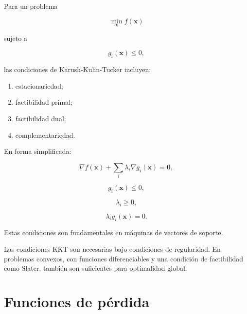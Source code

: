 \documentclass[
  spanish,
  10.5pt,
  letterpaper,
  DIV=11,
  numbers=noendperiod,
  oneside,
  open=any]{scrreprt}
\providecommand{\tightlist}{%
  \setlength{\itemsep}{0pt}\setlength{\parskip}{0pt}}
\theoremstyle{definition}
\theoremstyle{definition}
\theoremstyle{plain}
\theoremstyle{remark}
\begin{document}

Para un problema

\[
\min_{\mathbf{x}}
f(\mathbf{x})
\]

sujeto a

\[
g_i(\mathbf{x})\leq 0,
\]

las condiciones de Karush-Kuhn-Tucker incluyen:

\begin{enumerate}
\def\labelenumi{\arabic{enumi}.}
\tightlist
\item
  estacionariedad;
\item
  factibilidad primal;
\item
  factibilidad dual;
\item
  complementariedad.
\end{enumerate}

En forma simplificada:

\[
\nabla f(\mathbf{x})
+
\sum_i
\lambda_i
\nabla g_i(\mathbf{x})
=
\mathbf{0},
\]

\[
g_i(\mathbf{x})\leq 0,
\]

\[
\lambda_i\geq 0,
\]

\[
\lambda_i g_i(\mathbf{x})=0.
\]

Estas condiciones son fundamentales en máquinas de vectores de soporte.

\begin{tcolorbox}[enhanced jigsaw, arc=.35mm, bottomrule=.15mm, bottomtitle=1mm, breakable, colback=white, colbacktitle=quarto-callout-important-color!10!white, colframe=quarto-callout-important-color-frame, coltitle=black, left=2mm, leftrule=.75mm, opacityback=0, opacitybacktitle=0.6, rightrule=.15mm, title=\textcolor{quarto-callout-important-color}{\faExclamation}\hspace{0.5em}{Condiciones KKT}, titlerule=0mm, toprule=.15mm, toptitle=1mm]

Las condiciones KKT son necesarias bajo condiciones de regularidad. En
problemas convexos, con funciones diferenciables y una condición de
factibilidad como Slater, también son suficientes para optimalidad
global.

\end{tcolorbox}

\section*{Funciones de pérdida}\label{funciones-de-puxe9rdida}
\end{document}
